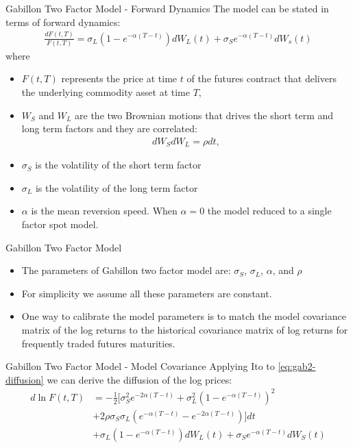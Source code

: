 \documentclass[11pt]{beamer}
\begin{document}
\begin{frame}{Gabillon Two Factor Model - Forward Dynamics}
The model can be stated in terms of forward dynamics:
\begin{align}
\frac{dF(t, T)}{F(t, T)} = \sigma_L (1 - e^{-\alpha(T-t)}) dW_L(t) + \sigma_S e^{-\alpha(T-t)} dW_s(t)
\label{eq:gab2-diffusion}
\end{align}
where 
\begin{itemize}
\item $F(t, T)$ represents the price at time $t$ of the futures contract that delivers the underlying commodity asset at time $T$,
\item $W_S$ and $W_L$ are the two Brownian motions that drives the short term and long term factors and they are correlated:
\begin{align*}
dW_S dW_L = \rho dt,
\end{align*}
\item $\sigma_S$ is the volatility of the short term factor
\item $\sigma_L$ is the volatility of the long term factor
\item $\alpha$ is the mean reversion speed. When $\alpha = 0$ the model reduced to a single factor spot model. 
\end{itemize}
\end{frame}


\begin{frame}{Gabillon Two Factor Model}
\begin{itemize}
\item The parameters of Gabillon two factor model are: $\sigma_S$, $\sigma_L$, $\alpha$, and $\rho$
\item For simplicity we assume all these parameters are constant.
\item One way to calibrate the model parameters is to match the model covariance matrix of the log returns to the historical covariance matrix of log returns for frequently traded futures maturities.
\end{itemize}

\end{frame}

\begin{frame}{Gabillon Two Factor Model - Model Covariance}
Applying Ito to \eqref{eq:gab2-diffusion} we can derive the diffusion of the log prices:
\begin{align*}
d \ln F(t, T) & = - \frac{1}{2}[ \sigma_S^2 e^{-2\alpha(T-t)} + \sigma_L^2(1-e^{-\alpha(T-t)})^2 \\
              & + 2 \rho \sigma_S \sigma_L \left(e^{-\alpha(T-t)} - e^{-2\alpha(T-t)}\right)] dt\\
              & + \sigma_L(1-e^{-\alpha(T-t)}) dW_L(t) 
                + \sigma_S e^{-\alpha(T-t)} dW_S(t)
\end{align*}

\end{frame}
\end{document}
